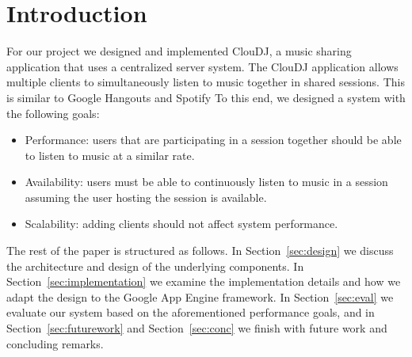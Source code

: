 \section{Introduction}
\label{sec:intro}
For our project we designed and implemented ClouDJ, 
a music sharing application that uses a centralized 
server system. The ClouDJ application allows multiple 
clients to simultaneously listen to music together 
in shared sessions. This is similar to Google Hangouts 
\cite{googlehangouts} and Spotify \cite{spotify}
To this end, we designed a system with the following goals:
\begin{itemize}
  \item Performance: users that are participating in 
    a session together should be able to listen to music at a similar rate.
  \item Availability: users must be able to continuously 
    listen to music in a session assuming the user hosting 
    the session is available.
  \item Scalability: adding clients should not affect system performance.
\end{itemize}
The rest of the paper is structured as follows. In Section~\ref{sec:design}
we discuss the architecture and design of the underlying components. 
In Section~\ref{sec:implementation} we examine the implementation details
and how we adapt the design to the Google App Engine framework. In 
Section~\ref{sec:eval} we evaluate our system based on the aforementioned
performance goals, and in Section~\ref{sec:futurework} and Section~\ref{sec:conc}
we finish with future work and concluding remarks.
